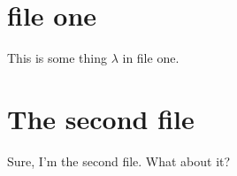 \documentclass{article}
\begin{document}
\section{file one}
This is some thing $\lambda$ in file one.
\section{The second file}
Sure, I'm the second file. What about it?
\end{document}
